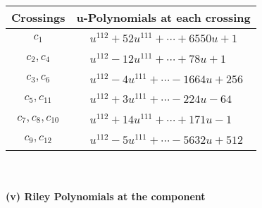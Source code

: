 \documentclass[1p]{elsarticle_modified}
\theoremstyle{definition}
\begin{document}
\begin{tabular}{m{50pt}|m{274pt}}
Crossings & \hspace{64pt}u-Polynomials at each crossing \\
\hline $$\begin{aligned}c_{1}\end{aligned}$$&$\begin{aligned}
&u^{112}+52 u^{111}+\cdots+6550 u+1
\end{aligned}$\\
\hline $$\begin{aligned}c_{2},c_{4}\end{aligned}$$&$\begin{aligned}
&u^{112}-12 u^{111}+\cdots+78 u+1
\end{aligned}$\\
\hline $$\begin{aligned}c_{3},c_{6}\end{aligned}$$&$\begin{aligned}
&u^{112}-4 u^{111}+\cdots-1664 u+256
\end{aligned}$\\
\hline $$\begin{aligned}c_{5},c_{11}\end{aligned}$$&$\begin{aligned}
&u^{112}+3 u^{111}+\cdots-224 u-64
\end{aligned}$\\
\hline $$\begin{aligned}c_{7},c_{8},c_{10}\end{aligned}$$&$\begin{aligned}
&u^{112}+14 u^{111}+\cdots+171 u-1
\end{aligned}$\\
\hline $$\begin{aligned}c_{9},c_{12}\end{aligned}$$&$\begin{aligned}
&u^{112}-5 u^{111}+\cdots-5632 u+512
\end{aligned}$\\
\hline
\end{tabular}\\~\\
\newpage\renewcommand{\arraystretch}{1}
\flushleft \textbf{(v) Riley Polynomials at the component}\newline \\
\end{document}
